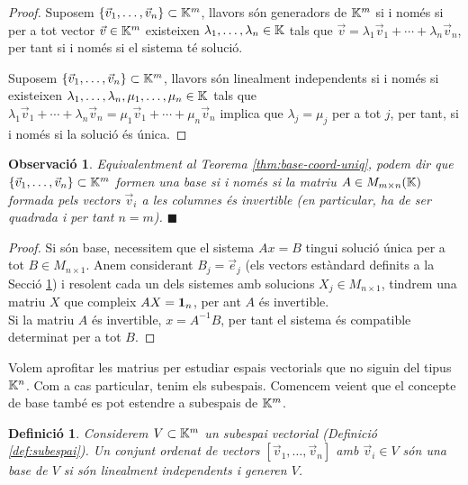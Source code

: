 \documentclass[
  11pt,
]{book}
\numberwithin{dummy}{section}
\theoremstyle{maincolornumbox}
\newtheorem{remarkT}{Observació}[chapter]
\theoremstyle{blacknumex}
\theoremstyle{blacknumbox}
\newtheorem{definitionT}{Definició}[chapter]
\theoremstyle{maincolornum}
\newenvironment{definition}{\begin{dBox}\begin{definitionT}}{\end{definitionT}\end{dBox}}
\newenvironment{remark}{\begin{remarkT}}{\hfill{\tiny\ensuremath{\blacksquare}}\end{remarkT}}
\newlength\esp
\begin{document}
\begin{proof}
Suposem \(\{\vec v_1, \dots, \vec v_n\} \subset \mathbb{K}^m\), llavors
són generadors de \(\mathbb{K}^m\) si i només si per a tot vector \(\vec v\in \mathbb{K}^m\)
existeixen \(\lambda_1, \dots, \lambda_n\in\mathbb{K}\) tals que
\(\vec v=\lambda_1\vec v_1+\cdots + \lambda_n\vec v_n\), per tant si i
només si el sistema té solució.

Suposem \(\{\vec v_1, \dots, \vec v_n\} \subset \mathbb{K}^m\), llavors són
linealment independents si i només si existeixen
\(\lambda_1, \dots, \lambda_n,\mu_1,\dots, \mu_n\in\mathbb{K}\) tals que
\(\lambda_1\vec v_1+\cdots + \lambda_n\vec v_n=\mu_1\vec v_1+\cdots + \mu_n\vec v_n\)
implica que \(\lambda_j=\mu_j\) per a tot \(j\), per tant, si i només si la
solució és única.
\end{proof}

\begin{remark}
Equivalentment al Teorema
\ref{thm:base-coord-uniq}, podem dir que
\(\{\vec v_1, \dots, \vec v_n\} \subset \mathbb{K}^m\) formen una base si i només
si la matriu \(A\in M_{m\times n}(\mathbb{K})\) formada pels vectors \(\vec v_i\) a
les columnes és invertible (en particular, ha de ser quadrada i per tant
\(n=m\)).
\end{remark}

\begin{proof}
Si són base, necessitem que el sistema \(Ax=B\) tingui solució
única per a tot \(B\in M_{n\times 1}\). Anem considerant \(B_j=\vec e_j\)
(els vectors estàndard definits a la Secció
\protect\hyperlink{subsec:matriusapl}{1}) i resolent cada un dels sistemes amb
solucions \(X_j\in M_{n\times 1}\), tindrem una matriu \(X\) que compleix
\(AX=\mathbf{1}_n\), per ant \(A\) és invertible.\\
Si la matriu \(A\) és invertible, \(x=A^{-1}B\), per tant el sistema és
compatible determinat per a tot \(B\).
\end{proof}

Volem aprofitar les matrius per estudiar espais vectorials que no siguin
del tipus \(\mathbb{K}^n\). Com a cas particular, tenim els subespais. Comencem
veient que el concepte de base també es pot estendre a subespais de
\(\mathbb{K}^m\).

\begin{definition}
Considerem \(V\subset \mathbb{K}^m\) un subespai vectorial (Definició
\ref{def:subespai}). Un conjunt ordenat de vectors
\([\vec v_1, \dots, \vec v_n]\) amb \(\vec v_i \in V\) són \emph{una base de \(V\)}
si són linealment independents i generen \(V\).
\end{definition}
\end{document}
